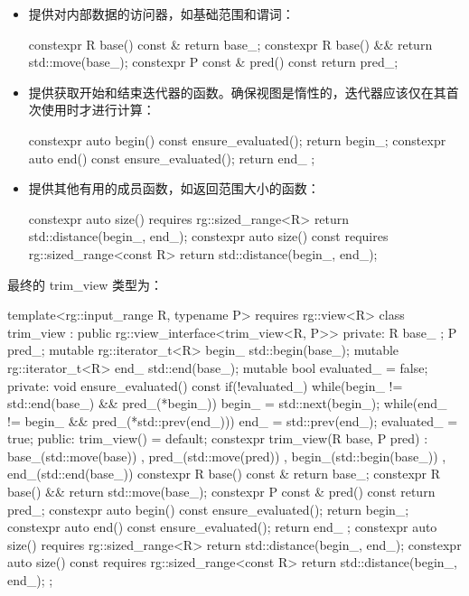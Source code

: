 \begin{itemize}
\item
提供对内部数据的访问器，如基础范围和谓词：

\begin{cpp}
constexpr R base() const &       {return base_;}
constexpr R base() &&            {return std::move(base_);}
constexpr P const & pred() const { return pred_; }
\end{cpp}

\item
提供获取开始和结束迭代器的函数。确保视图是惰性的，迭代器应该仅在其首次使用时才进行计算：

\begin{cpp}
constexpr auto begin() const
{ ensure_evaluated(); return begin_; }
constexpr auto end() const
{ ensure_evaluated(); return end_ ; }
\end{cpp}

\item
提供其他有用的成员函数，如返回范围大小的函数：

\begin{cpp}
constexpr auto size() requires rg::sized_range<R>
{ return std::distance(begin_, end_); }
constexpr auto size() const requires rg::sized_range<const R>
{ return std::distance(begin_, end_); }
\end{cpp}
\end{itemize}

最终的 trim\_view 类型为：

\begin{cpp}
template<rg::input_range R, typename P> requires rg::view<R>
class trim_view : public rg::view_interface<trim_view<R, P>>
{
private:
    R base_ {};
    P pred_;
    mutable rg::iterator_t<R> begin_ {std::begin(base_)};
    mutable rg::iterator_t<R> end_   {std::end(base_)};
    mutable bool evaluated_ = false;
private:
    void ensure_evaluated() const
    {
        if(!evaluated_)
        {
            while(begin_ != std::end(base_) && pred_(*begin_))
            {begin_ = std::next(begin_);}
            while(end_ != begin_ && pred_(*std::prev(end_)))
            {end_ = std::prev(end_);}
            evaluated_ = true;
        }
    }
public:
    trim_view() = default;
    constexpr trim_view(R base, P pred)
        : base_(std::move(base))
        , pred_(std::move(pred))
        , begin_(std::begin(base_))
        , end_(std::end(base_))
    {}
    constexpr R base() const &       {return base_;}
    constexpr R base() &&            {return std::move(base_);}
    constexpr P const & pred() const { return pred_; }
    constexpr auto begin() const
    { ensure_evaluated(); return begin_; }
    constexpr auto end() const
    { ensure_evaluated(); return end_ ; }
    constexpr auto size() requires rg::sized_range<R>
    { return std::distance(begin_, end_); }
    constexpr auto size() const requires rg::sized_range<const R>
    { return std::distance(begin_, end_); }
};
\end{cpp}

